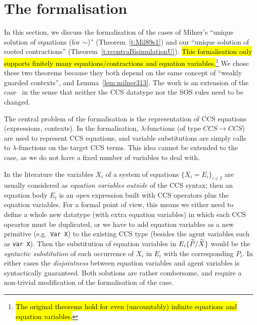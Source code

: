 
\section{The \multivariate formalisation}
\label{sec:multivariate}

In this section,  we discuss the formalisation of the \multivariate
cases of Milner's ``unique solution of equations (for $\sim$)''
(Theorem~\ref{t:Mil89s1}) and our ``unique solution of rooted
contractions'' (Theorem~\ref{t:rcontraBisimulationU}).
\hl{This formalisation only supports finitely many
  equations/contractions and equation variables.}\footnote{\hl{The original theorems
hold for even (uncountably) infinite equations and equation variables.}}
We chose these two theorems because they both depend on the same
concept of ``weakly guarded contexts'', and Lemma~\ref{lem:milner313}.
The work is an extension of the \univariate case~\cite{EPTCS276.10}
 in the sense that neither the CCS datatype nor
the SOS rules need to be changed.

The central problem of the \multivariate formalisation is the
representation of CCS equations (expressions, contexts).
In the \univariate formalisation, $\lambda$-functions (of type
$CCS\rightarrow CCS$) are used to represent \univariate CCS
equations, and variable substitutions are simply 
calls to $\lambda$-functions on the target CCS terms.
This idea cannot be extended to the \multivariate case, as
we do not have a fixed number of variables to deal with.

In the  literature the variables  $X_i$ of
a system of equations $\{X_i = E_i\}_{i\in I}$ are usually considered as
\emph{equation variables}
\emph{outside} of the CCS syntax; then an equation body  $E_i$  is an \emph{open} expression
built with CCS operators plus the equation variables.
For a formal point of view, this means we either need to define a
whole new datatype (with extra equation variables) in which each CCS
opeartor must be duplicated, or we have to  add equation variables as a
new primitive (e.g.~\texttt{Var X}) to the existing CCS type (besides
the agent variables such as  \texttt{var X}).
 Then the substitution of equation
variables in $E_i\{\widetilde P/\widetilde X\}$ would be the \emph{syntactic substitution} of
each occurrence of $X_i$ in $E_i$ with the corresponding $P_i$.
In either cases the \emph{disjointness} between equation variables and
agent variables is syntactically
guaranteed. Both solutions are rather combersome, and require a non-trivial modification
of the formalisation of the \univariate case.

